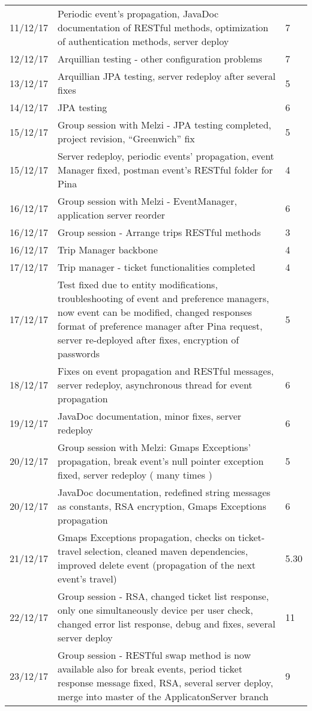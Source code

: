 \begin{longtable}{ p{2cm} p{10cm} p{3cm}}
	11/12/17 & Periodic event's propagation, JavaDoc documentation of RESTful methods, optimization of authentication methods, server deploy & 7 \\
	12/12/17 & Arquillian testing - other configuration problems & 7 \\
	13/12/17 & Arquillian JPA testing, server redeploy after several fixes & 5 \\
	14/12/17 & JPA testing & 6 \\
	15/12/17 & Group session with Melzi - JPA testing completed, project revision, “Greenwich” fix & 5 \\
	15/12/17 & Server redeploy, periodic events' propagation, event Manager fixed, postman event's RESTful folder for Pina & 4 \\
	16/12/17 & Group session with Melzi - EventManager, application server reorder  & 6 \\
	16/12/17 & Group session - Arrange trips RESTful methods & 3 \\
	16/12/17 & Trip Manager backbone & 4 \\
	17/12/17 & Trip manager - ticket functionalities completed & 4 \\
	17/12/17 & Test fixed due to entity modifications, troubleshooting of event and preference managers, now event can be modified, changed responses format of preference manager after Pina request, server re-deployed after fixes, encryption of passwords & 5 \\
	18/12/17 & Fixes on event propagation and RESTful messages, server redeploy, asynchronous thread for event propagation
 & 6 \\
	19/12/17 & JavaDoc documentation, minor fixes, server redeploy & 6 \\
	20/12/17 & Group session with Melzi: Gmaps Exceptions' propagation, break event's null pointer exception fixed, server redeploy ( many times ) & 5 \\
	20/12/17 & JavaDoc documentation, redefined string messages as constants, RSA encryption, Gmaps Exceptions propagation & 6 \\
	21/12/17 & Gmaps Exceptions propagation, checks on ticket-travel selection, cleaned maven dependencies, improved delete event (propagation of the next event's travel) & 5.30 \\
	22/12/17 & Group session - RSA, changed ticket list response, only one simultaneously device per user check, changed error list response, debug and fixes, several server deploy & 11 \\
	23/12/17 & Group session - RESTful swap method is now available also for break events, period ticket response message fixed, RSA, several server deploy, merge into master of the ApplicatonServer branch & 9 \\

\end{longtable}
